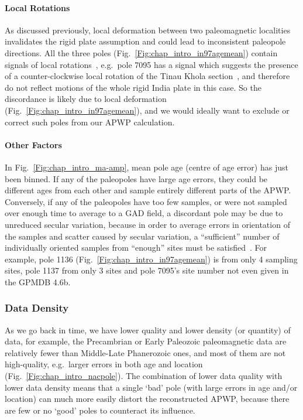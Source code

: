 \paragraph{Local Rotations}

As discussed previously, local deformation between two paleomagnetic localities
invalidates the rigid plate assumption and could lead to inconsistent paleopole
directions. All the three poles (Fig.~\ref{Fig:chap_intro_in97agemean})
contain signals of local rotations~\citep{O82,G94}, e.g.\ pole 7095 has a signal
which suggests the presence of a counter-clockwise local rotation of the Tinau
Khola section~\citep{G94}, and therefore do not reflect motions of the whole
rigid India plate in this case. So the discordance is likely due to local
deformation (Fig.~\ref{Fig:chap_intro_in97agemean}), and we would ideally
want to exclude or correct such poles from our APWP calculation.

\paragraph{Other Factors}

In Fig.~\ref{Fig:chap_intro_ma-amp}, mean pole age (centre of age error) has
just been binned. If any of the paleopoles have large age errors, they could be
different ages from each other and sample entirely different parts of the
APWP\@. Conversely, if any of the paleopoles have too few samples, or were not
sampled over enough time to average to a GAD field, a discordant pole may be due
to unreduced secular variation, because in order to average errors in
orientation of the samples and scatter caused by secular variation, a
``sufficient'' number of individually oriented samples from ``enough'' sites
must be satisfied~\citep{T19,v90,B02}. For example, pole 1136
(Fig.~\ref{Fig:chap_intro_in97agemean}) is from only 4 sampling sites, pole 1137
from only 3 sites and pole 7095's site number not even given in the GPMDB 4.6b.

\subsubsection{Data Density}

As we go back in time, we have lower quality and lower density (or quantity) of
data, for example, the Precambrian or Early Paleozoic paleomagnetic data are
relatively fewer than Middle-Late Phanerozoic ones, and most of them are not
high-quality, e.g.\ larger errors in both age and location
(Fig.~\ref{Fig:chap_intro_nacpole}). The combination of lower data quality with
lower data density means that a single `bad' pole (with large errors in age
and/or location) can much more easily distort the reconstructed APWP, because
there are few or no `good' poles to counteract its influence.


